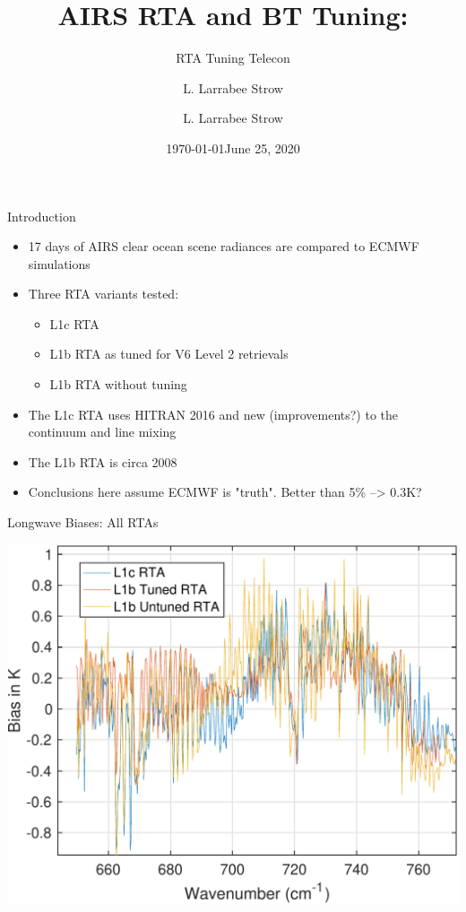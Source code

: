 \documentclass[10pt,t]{beamer}
\author{L. Larrabee Strow}
\date{\today}
\title{\large AIRS RTA and BT Tuning:}
\subtitle{\footnotesize{RTA Tuning Telecon}}
\date{\vspace{0.1in}\footnotesize{June 25, 2020 \vfill}}
\author{L. Larrabee Strow}
\begin{document}
\maketitle
{}

\begin{frame}[label={sec:org472f9d3}]{Introduction}
\begin{itemize}
\item 17 days of AIRS clear ocean scene radiances are compared to ECMWF simulations
\item Three RTA variants tested:
\begin{itemize}
\item L1c RTA
\item L1b RTA as tuned for V6 Level 2 retrievals
\item L1b RTA without tuning
\end{itemize}
\item The L1c RTA uses HITRAN 2016 and new (improvements?) to the continuum and line mixing
\item The L1b RTA is circa 2008
\item Conclusions here assume ECMWF is "truth".  Better than 5\% --> 0.3K?
\end{itemize}
\end{frame}
\begin{frame}[label={sec:orgf207f3e}]{Longwave Biases: All RTAs}
\begin{center}
\includegraphics[width=0.75\linewidth]{./bias_3rta_lw.pdf}
\end{center}
\end{frame}
\end{document}
